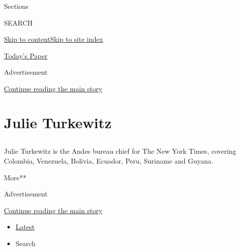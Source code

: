 Sections

SEARCH

\protect\hyperlink{site-content}{Skip to
content}\protect\hyperlink{site-index}{Skip to site index}

\href{https://myaccount.nytimes3xbfgragh.onion/auth/login?response_type=cookie\&client_id=vi}{}

\href{https://www.nytimes3xbfgragh.onion/section/todayspaper}{Today's
Paper}

Advertisement

\protect\hyperlink{after-top}{Continue reading the main story}

\hypertarget{julie-turkewitz}{%
\section{Julie Turkewitz}\label{julie-turkewitz}}

\subsection{}

Julie Turkewitz is the Andes bureau chief for The New York Times,
covering Colombia, Venezuela, Bolivia, Ecuador, Peru, Suriname and
Guyana.

More**

Advertisement

\protect\hyperlink{after-mid1}{Continue reading the main story}

\begin{itemize}
\tightlist
\item
  \protect\hyperlink{stream-panel}{Latest}
\item
  Search
\end{itemize}

